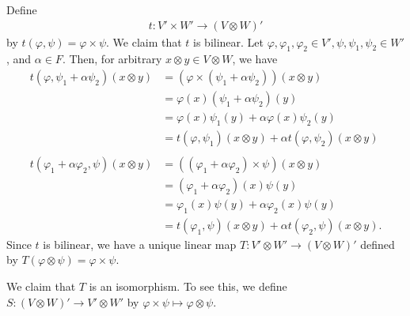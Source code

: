 \documentclass[10pt]{mypackage}
\begin{document}
\begin{solution}
\begin{enumerate}[(a)]
      Define
      \begin{align*}
        t: V'\times W'\rightarrow \left(V\otimes W\right)'
      \end{align*}
      by $t\left(\varphi,\psi\right) = \varphi\times \psi$. We claim that $t$ is bilinear. Let $\varphi,\varphi_1,\varphi_2\in V', \psi,\psi_1,\psi_2\in W'$, and $\alpha\in F$. Then, for arbitrary $x\otimes y\in V\otimes W$, we have
      \begin{align*}
        t\left(\varphi,\psi_1 + \alpha\psi_2\right)\left(x\otimes y\right) &= \left(\varphi\times \left(\psi_1 + \alpha \psi_2\right)\right)\left(x\otimes y\right)\\
                                                                           &= \varphi\left(x\right)\left(\psi_1 + \alpha \psi_2\right)\left(y\right)\\
                                                                           &= \varphi\left(x\right)\psi_1\left(y\right) + \alpha\varphi\left(x\right)\psi_2\left(y\right)\\
                                                                           &= t\left(\varphi,\psi_1\right)\left(x\otimes y\right) + \alpha t\left(\varphi,\psi_2\right)\left(x\otimes y\right)\\
                                                                           \\
        t\left(\varphi_1 + \alpha \varphi_2,\psi\right)\left(x\otimes y\right) &= \left(\left(\varphi_1 + \alpha\varphi_2\right)\times \psi\right)\left(x\otimes y\right)\\
                                                                               &= \left(\varphi_1 + \alpha\varphi_2\right)\left(x\right)\psi\left(y\right)\\
                                                                               &= \varphi_1\left(x\right)\psi\left(y\right) + \alpha\varphi_2\left(x\right)\psi\left(y\right)\\
                                                                               &= t\left(\varphi_1,\psi\right)\left(x\otimes y\right) + \alpha t\left(\varphi_2,\psi\right)\left(x\otimes y\right).
      \end{align*}
      Since $t$ is bilinear, we have a unique linear map $T: V'\otimes W'\rightarrow \left(V\otimes W\right)'$ defined by $T\left(\varphi\otimes \psi\right) = \varphi\times \psi$.\newline

      We claim that $T$ is an isomorphism. To see this, we define $S: \left(V\otimes W\right)' \rightarrow V'\otimes W'$ by $\varphi\times \psi \mapsto \varphi\otimes \psi$.\newline


\end{enumerate}
\end{solution}
\end{document}
